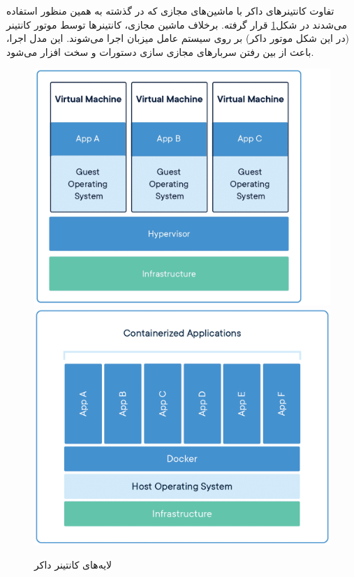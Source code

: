 تفاوت کانتینرهای داکر با ماشین‌های مجازی که در گذشته به همین منظور استفاده می‌شدند در شکل\ref{fig:docker-container-vm}‌ قرار گرفته. برخلاف ماشین مجازی، کانتینرها توسط موتور کانتینر (در این شکل موتور داکر) بر روی سیستم عامل میزبان اجرا می‌شوند. این مدل اجرا، باعث از بین  رفتن سربارهای مجازی سازی دستورات و سخت افزار می‌شود.

\begin{figure}[h]
	\vspace{1cm}
	\centering
	\includegraphics[scale=0.17]{figures/container-vm-whatcontainer.png}
	\includegraphics[scale=0.17]{figures/docker-containerized-appliction-blue-border.png}
	\caption{لایه‌های کانتینر داکر}
	\label{fig:docker-container-vm}
\end{figure}


